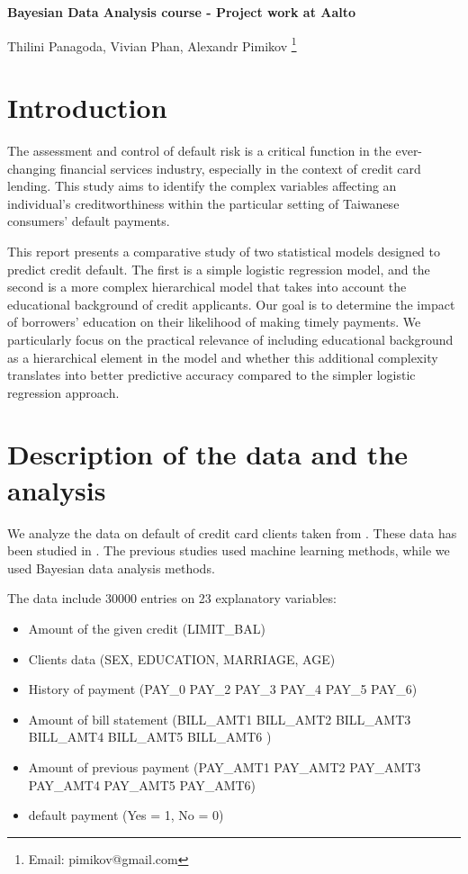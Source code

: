 \documentclass[a4paper]{artikel3}
\begin{document}
\begin{center}
{\Large \onehalfspacing \bf Bayesian Data Analysis course - Project work at Aalto}
\end{center}
\vspace{10pt}


\begin{center}
Thilini Panagoda, Vivian Phan, Alexandr Pimikov
\footnote{Email: pimikov@gmail.com}


\end{center}
\section{Introduction}

The assessment and control of default risk is a critical function in the ever-changing financial services industry, especially in the context of credit card lending. This study aims to identify the complex variables affecting an individual's creditworthiness within the particular setting of Taiwanese consumers' default payments. 

This report presents a comparative study of two statistical models designed to predict credit default. The first is a simple logistic regression model, and the second is a more complex hierarchical model that takes into account the educational background of credit applicants. Our goal is to determine the impact of borrowers' education on their likelihood of making timely payments. We particularly focus on the practical relevance of including educational background as a hierarchical element in the model and whether this additional complexity translates into better predictive accuracy compared to the simpler logistic regression approach.

\section{Description of the data and the analysis}

We analyze the data on default of credit card clients taken from \cite{data}. 
These data has been studied in \cite{mining,dancing}. The previous studies used machine learning methods, while we used Bayesian data analysis methods.

The data include 30000 entries on 23 explanatory variables:
\begin{itemize}
    \item Amount of the given credit (LIMIT\_BAL)
    \item Clients data (SEX, EDUCATION, MARRIAGE, AGE)
    \item History of payment (PAY\_0  PAY\_2     PAY\_3     PAY\_4     PAY\_5    PAY\_6)  
    \item Amount of bill statement (BILL\_AMT1 BILL\_AMT2 BILL\_AMT3 BILL\_AMT4 BILL\_AMT5 BILL\_AMT6 )
    \item Amount of previous payment (PAY\_AMT1  PAY\_AMT2  PAY\_AMT3  PAY\_AMT4  PAY\_AMT5  PAY\_AMT6)
    \item default payment (Yes = 1, No = 0)
\end{itemize}
\end{document}
